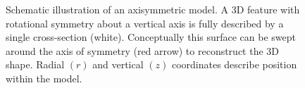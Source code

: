 \begin{figure}
    \caption[Axisymmetry]{Schematic illustration of an axisymmetric model. A 3D feature with rotational symmetry about a vertical axis is fully described by a single cross-section (white). Conceptually this surface can be swept around the axis of symmetry (red arrow) to reconstruct the 3D shape. Radial $(r)$ and vertical $(z)$ coordinates describe position within the model.}%
    \label{fig:axisymmetry}
\end{figure}